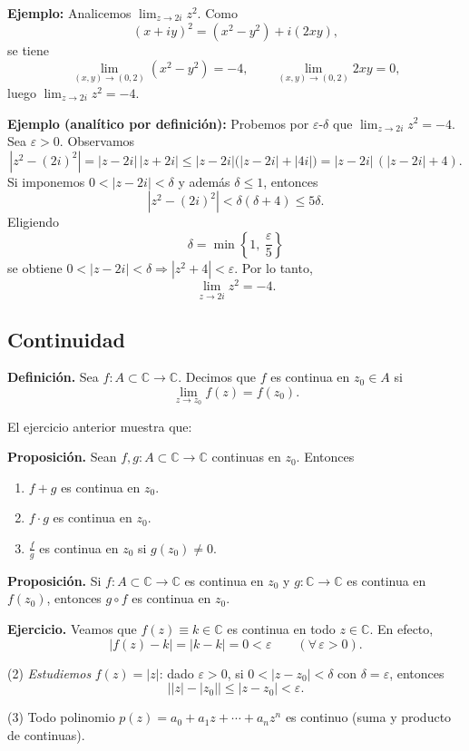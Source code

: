 \documentclass[a4paper,12pt]{article}
\begin{document}
\noindent\textbf{Ejemplo:} Analicemos \(\displaystyle \lim_{z\to 2i} z^2\).
Como
\[
(x+iy)^2=(x^2-y^2)+i(2xy),
\]
se tiene
\[
\lim_{(x,y)\to(0,2)}(x^2-y^2)=-4,
\qquad
\lim_{(x,y)\to(0,2)}2xy=0,
\]
luego \(\displaystyle \lim_{z\to 2i} z^2=-4\).

\noindent\textbf{Ejemplo (analítico por definición):}
Probemos por \(\varepsilon\)-\(\delta\) que \(\displaystyle \lim_{z\to 2i} z^2=-4\).
Sea \(\varepsilon>0\). Observamos
\[
|z^2-(2i)^2|=|z-2i|\,|z+2i|
\le |z-2i|\bigl(|z-2i|+|4i|\bigr)
=|z-2i|\,(|z-2i|+4).
\]
Si imponemos \(0<|z-2i|<\delta\) y además \(\delta\le 1\), entonces
\[
|z^2-(2i)^2|
< \delta(\delta+4)\le 5\delta.
\]
Eligiendo
\[
\delta=\min\!\left\{1,\ \frac{\varepsilon}{5}\right\}
\]
se obtiene \(0<|z-2i|<\delta \Rightarrow |z^2+4|<\varepsilon\). Por lo tanto,
\[
\lim_{z\to 2i} z^2=-4.
\]

\subsection{Continuidad}

\textbf{Definición.}
Sea \(f:A\subset\mathbb{C}\to\mathbb{C}\).
Decimos que \(f\) es continua en \(z_0\in A\) si
\[
\lim_{z\to z_0} f(z)=f(z_0).
\]

El ejercicio anterior muestra que:

\textbf{Proposición.}
Sean \(f,g:A\subset\mathbb{C}\to\mathbb{C}\) continuas en \(z_0\).
Entonces
\begin{enumerate}[label=(\arabic*)]
  \item \(f+g\) es continua en \(z_0\).
  \item \(f\cdot g\) es continua en \(z_0\).
  \item \(\displaystyle \frac{f}{g}\) es continua en \(z_0\) si \(g(z_0)\neq 0\).
\end{enumerate}

\textbf{Proposición.}
Si \(f:A\subset\mathbb{C}\to\mathbb{C}\) es continua en \(z_0\) y
\(g:\mathbb{C}\to\mathbb{C}\) es continua en \(f(z_0)\), entonces \(g\circ f\)
es continua en \(z_0\).

\textbf{Ejercicio.}
Veamos que \(f(z)\equiv k\in\mathbb{C}\) es continua en todo \(z\in\mathbb{C}\).
En efecto,
\[
|f(z)-k|=|k-k|=0<\varepsilon \qquad (\forall\,\varepsilon>0).
\]

(2) \textit{Estudiemos} \(f(z)=|z|\):
dado \(\varepsilon>0\), si \(0<|z-z_0|<\delta\) con \(\delta=\varepsilon\), entonces
\[
\big||z|-|z_0|\big|\le |z-z_0|<\varepsilon.
\]

(3) Todo polinomio \(p(z)=a_0+a_1z+\cdots+a_nz^n\) es continuo (suma y
producto de continuas).
\end{document}
